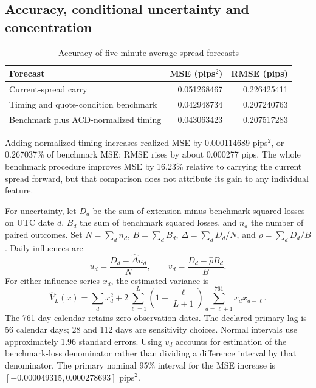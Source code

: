 \documentclass[12pt,letterpaper]{article}
\begin{document}
\subsection{Accuracy, conditional uncertainty and concentration}

\begin{table}[tbp]
\centering\small
\caption{Accuracy of five-minute average-spread forecasts}
\label{tab:spread-accuracy}
\begin{tabular}{lrr}
\toprule
Forecast & MSE (pips$^2$) & RMSE (pips) \\
\midrule
Current-spread carry & 0.051268467 & 0.226425411 \\
Timing and quote-condition benchmark & 0.042948734 & 0.207240763 \\
Benchmark plus ACD-normalized timing & 0.043063423 & 0.207517283 \\
\bottomrule
\end{tabular}
\end{table}

Adding normalized timing increases realized MSE by 0.000114689 pips$^2$, or 0.267037\% of benchmark MSE; RMSE rises by about 0.000277 pips. The whole benchmark procedure improves MSE by 16.23\% relative to carrying the current spread forward, but that comparison does not attribute its gain to any individual feature.

For uncertainty, let $D_d$ be the sum of extension-minus-benchmark squared losses on UTC date $d$, $B_d$ the sum of benchmark squared losses, and $n_d$ the number of paired outcomes. Set $N=\sum_dn_d$, $B=\sum_d B_d$, $\widehat\Delta=\sum_d D_d/N$, and $\widehat\rho=\sum_dD_d/B$. Daily influences are
\begin{equation}
 u_d=\frac{D_d-\widehat\Delta n_d}{N},\qquad
 v_d=\frac{D_d-\widehat\rho B_d}{B}.
\end{equation}
For either influence series $x_d$, the estimated variance is
\begin{equation}
 \widehat V_L(x)=\sum_dx_d^2+
 2\sum_{\ell=1}^{L}\left(1-\frac{\ell}{L+1}\right)
 \sum_{d=\ell+1}^{761}x_dx_{d-\ell}.
\end{equation}
The 761-day calendar retains zero-observation dates. The declared primary lag is 56 calendar days; 28 and 112 days are sensitivity choices. Normal intervals use approximately 1.96 standard errors. Using $v_d$ accounts for estimation of the benchmark-loss denominator rather than dividing a difference interval by that denominator. The primary nominal 95\% interval for the MSE increase is $[-0.000049315,0.000278693]$ pips$^2$.
\end{document}

